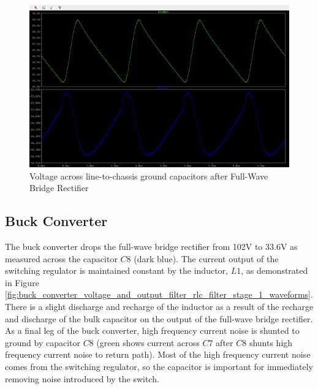 \documentclass[conference]{IEEEtran}
\begin{document}
\begin{figure}[htp]
    \centering
    \includegraphics[width=1.0\linewidth]{full_wave_bridge_rectifier_chassis_caps_waveform.png}
    \caption{Voltage across line-to-chassis ground capacitors after Full-Wave Bridge Rectifier}
    \label{fig:full_wave_bridge_rectifier_chassis_caps_waveform}
\end{figure}

\FloatBarrier

\subsection{Buck Converter}

The buck converter drops the full-wave bridge rectifier from 102V to 33.6V as measured across the capacitor $C8$ (dark blue). The current output of the switching regulator is maintained constant by the inductor, $L1$, as demonstrated in Figure \ref{fig:buck_converter_voltage_and_output_filter_rlc_filter_stage_1_waveforms}. There is a slight discharge and recharge of the inductor as a result of the recharge and discharge of the bulk capacitor on the output of the full-wave bridge rectifier. As a final leg of the buck converter, high frequency current noise is shunted to ground by capacitor $C8$ (green shows current across $C7$ after $C8$ shunts high frequency current noise to return path). Most of the high frequency current noise comes from the switching regulator, so the capacitor is important for immediately removing noise introduced by the switch.
\end{document}
